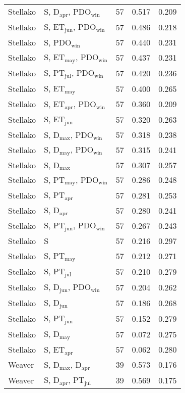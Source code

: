\begin{longtable}{llrrr}
Stellako & S, D$_\mathrm{apr}$, PDO$_\mathrm{win}$ & 57 & 0.517 & 0.209 \\ 
Stellako & S, ET$_\mathrm{jun}$, PDO$_\mathrm{win}$ & 57 & 0.486 & 0.218 \\ 
Stellako & S, PDO$_\mathrm{win}$ & 57 & 0.440 & 0.231 \\ 
Stellako & S, ET$_\mathrm{may}$, PDO$_\mathrm{win}$ & 57 & 0.437 & 0.231 \\ 
Stellako & S, PT$_\mathrm{jul}$, PDO$_\mathrm{win}$ & 57 & 0.420 & 0.236 \\ 
Stellako & S, ET$_\mathrm{may}$ & 57 & 0.400 & 0.265 \\ 
Stellako & S, ET$_\mathrm{apr}$, PDO$_\mathrm{win}$ & 57 & 0.360 & 0.209 \\ 
Stellako & S, ET$_\mathrm{jun}$ & 57 & 0.320 & 0.263 \\ 
Stellako & S, D$_\mathrm{max}$, PDO$_\mathrm{win}$ & 57 & 0.318 & 0.238 \\ 
Stellako & S, D$_\mathrm{may}$, PDO$_\mathrm{win}$ & 57 & 0.315 & 0.241 \\ 
Stellako & S, D$_\mathrm{max}$ & 57 & 0.307 & 0.257 \\ 
Stellako & S, PT$_\mathrm{may}$, PDO$_\mathrm{win}$ & 57 & 0.286 & 0.248 \\ 
Stellako & S, PT$_\mathrm{apr}$ & 57 & 0.281 & 0.253 \\ 
Stellako & S, D$_\mathrm{apr}$ & 57 & 0.280 & 0.241 \\ 
Stellako & S, PT$_\mathrm{jun}$, PDO$_\mathrm{win}$ & 57 & 0.267 & 0.243 \\ 
Stellako & S & 57 & 0.216 & 0.297 \\
Stellako & S, PT$_\mathrm{may}$ & 57 & 0.212 & 0.271 \\ 
Stellako & S, PT$_\mathrm{jul}$ & 57 & 0.210 & 0.279 \\ 
Stellako & S, D$_\mathrm{jun}$, PDO$_\mathrm{win}$ & 57 & 0.204 & 0.262 \\ 
Stellako & S, D$_\mathrm{jun}$ & 57 & 0.186 & 0.268 \\ 
Stellako & S, PT$_\mathrm{jun}$ & 57 & 0.152 & 0.279 \\ 
Stellako & S, D$_\mathrm{may}$ & 57 & 0.072 & 0.275 \\ 
Stellako & S, ET$_\mathrm{apr}$ & 57 & 0.062 & 0.280 \\ 
Weaver & S, D$_\mathrm{max}$, D$_\mathrm{apr}$ & 39 & 0.573 & 0.176 \\ 
Weaver & S, D$_\mathrm{apr}$, PT$_\mathrm{jul}$ & 39 & 0.569 & 0.175 \\ 

\end{longtable}
